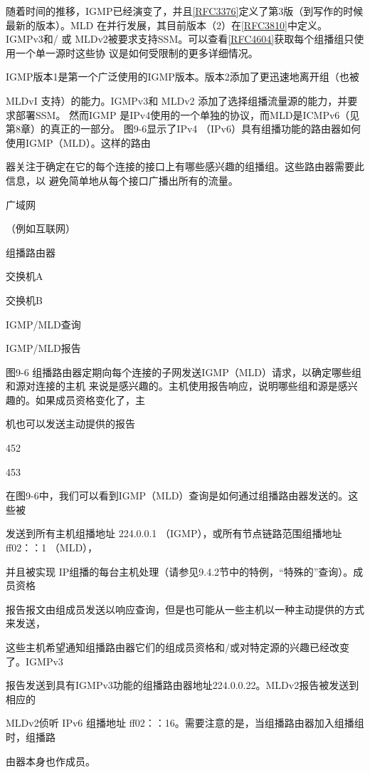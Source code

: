 随着时间的推移，IGMP已经演变了，并且\href{https://www.rfc-editor.org/rfc/rfc3376}{[RFC3376]}定义了第3版（到写作的时候
最新的版本）。MLD 在并行发展，其目前版本（2）在\href{https://www.rfc-editor.org/rfc/rfc3810}{[RFC3810]}中定义。IGMPv3和/ 或
MLDv2被要求支持SSM。可以查看\href{https://www.rfc-editor.org/rfc/rfc4604}{[RFC4604]}获取每个组播组只使用一个单一源时这些协
议是如何受限制的更多详细情况。

IGMP版本1是第一个广泛使用的IGMP版本。版本2添加了更迅速地离开组（也被

MLDvI 支持）的能力。IGMPv3和 MLDv2 添加了选择组播流量源的能力，并要求部署SSM。
然而IGMP 是IPv4使用的一个单独的协议，而MLD是ICMPv6（见第8章）的真正的一部分。
图9-6显示了IPv4 （IPv6）具有组播功能的路由器如何使用IGMP（MLD）。这样的路由

器关注于确定在它的每个连接的接口上有哪些感兴趣的组播组。这些路由器需要此信息，以
避免简单地从每个接口广播出所有的流量。

广域网

（例如互联网）

组播路由器

交换机A

交换机B

IGMP/MLD查询

IGMP/MLD报告

图9-6 组播路由器定期向每个连接的子网发送IGMP（MLD）请求，以确定哪些组和源对连接的主机
来说是感兴趣的。主机使用报告响应，说明哪些组和源是感兴趣的。如果成员资格变化了，主

机也可以发送主动提供的报告

452

453

在图9-6中，我们可以看到IGMP（MLD）查询是如何通过组播路由器发送的。这些被

发送到所有主机组播地址 224.0.0.1 （IGMP），或所有节点链路范围组播地址 ff02：：1 （MLD），

并且被实现 IP组播的每台主机处理（请参见9.4.2节中的特例，“特殊的”查询）。成员资格

报告报文由组成员发送以响应查询，但是也可能从一些主机以一种主动提供的方式来发送，

这些主机希望通知组播路由器它们的组成员资格和/或对特定源的兴趣已经改变了。IGMPv3

报告发送到具有IGMPv3功能的组播路由器地址224.0.0.22。MLDv2报告被发送到相应的

MLDv2侦听 IPv6 组播地址 ff02：：16。需要注意的是，当组播路由器加入组播组时，组播路

由器本身也作成员。


